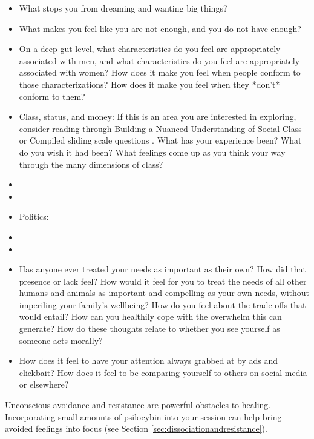 \documentclass[12pt,letterpaper]{article}
\begin{document}
\begin{itemize}
    \item What stops you from dreaming and wanting big things?
    \item What makes you feel like you are not enough, and you do not have enough?
    \item On a deep gut level, what characteristics do you feel are appropriately associated with men, and what characteristics do you feel are appropriately associated with women? How does it make you feel when people conform to those characterizations? How does it make you feel when they *don't* conform to them?
    \item Class, status, and money: If this is an area you are interested in exploring, consider reading through Building a Nuanced Understanding of Social Class or Compiled sliding scale questions . What has your experience been? What do you wish it had been? What feelings come up as you think your way through the many dimensions of class?
    \item {}
    \item {}
    \item Politics: 
    \item {}
    \item {}
    \item {} Has anyone ever treated your needs as important as their own? How did that presence or lack feel? How would it feel for you to treat the needs of all other humans and animals as important and compelling as your own needs, without imperiling your family's wellbeing? How do you feel about the trade-offs that would entail?  How can you healthily cope with the overwhelm this can generate? How do these thoughts relate to whether you see yourself as someone acts morally?
    \item How does it feel to have your attention always grabbed at by ads and clickbait? How does it feel to be comparing yourself to others on social media or elsewhere?
\end{itemize}
Unconscious avoidance and resistance are powerful obstacles to healing. Incorporating small amounts of psilocybin into your session can help bring avoided feelings into focus (see Section \ref{sec:dissociationandresistance}).
\end{document}
